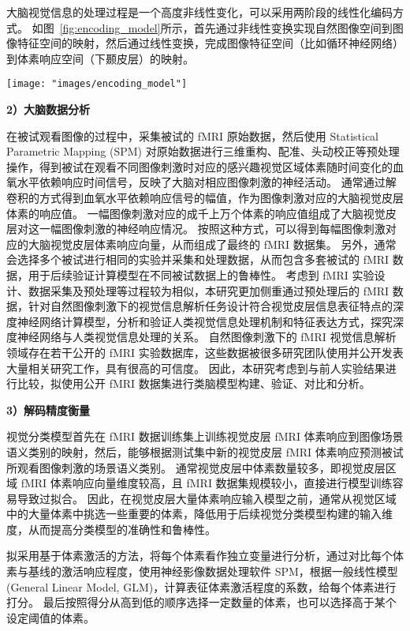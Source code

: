 \documentclass[a4paper,zihao=-4]{article}
\begin{document}
大脑视觉信息的处理过程是一个高度非线性变化，可以采用两阶段的线性化编码方式。
如图~\ref{fig:encoding_model}所示，首先通过非线性变换实现自然图像空间到图像特征空间的映射，然后通过线性变换，完成图像特征空间（比如循环神经网络）到体素响应空间（下颞皮层）的映射。
\begin{figure*}[htb!]
	\centering  
	{\texttt{[image: "images/encoding\_model"]}
	}
	\caption{ 两阶段非线性视觉编码模型原理图}
	\label{fig:encoding_model}
\end{figure*}


\textbf{2）大脑数据分析}

在被试观看图像的过程中，采集被试的 fMRI 原始数据，然后使用 Statistical Parametric Mapping (SPM) 对原始数据进行三维重构、配准、头动校正等预处理操作，得到被试在观看不同图像刺激时对应的感兴趣视觉区域体素随时间变化的血氧水平依赖响应时间信号，反映了大脑对相应图像刺激的神经活动。
通常通过解卷积的方式得到血氧水平依赖响应信号的幅值，作为图像刺激对应的大脑视觉皮层体素的响应值。
一幅图像刺激对应的成千上万个体素的响应值组成了大脑视觉皮层对这一幅图像刺激的神经响应情况。
按照这种方式，可以得到每幅图像刺激对应的大脑视觉皮层体素响应向量，从而组成了最终的 fMRI 数据集。
另外，通常会选择多个被试进行相同的实验并采集和处理数据，从而包含多套被试的 fMRI 数据，用于后续验证计算模型在不同被试数据上的鲁棒性。
考虑到 fMRI 实验设计、数据采集及预处理等过程较为相似，本研究更加侧重通过预处理后的 fMRI 数据，针对自然图像刺激下的视觉信息解析任务设计符合视觉皮层信息表征特点的深度神经网络计算模型，分析和验证人类视觉信息处理机制和特征表达方式，探究深度神经网络与人类视觉信息处理的关系。
自然图像刺激下的 fMRI 视觉信息解析领域存在若干公开的 fMRI 实验数据库，这些数据被很多研究团队使用并公开发表大量相关研究工作，具有很高的可信度。
因此，本研究考虑到与前人实验结果进行比较，拟使用公开 fMRI 数据集进行类脑模型构建、验证、对比和分析。


\textbf{3）解码精度衡量}

视觉分类模型首先在 fMRI 数据训练集上训练视觉皮层 fMRI 体素响应到图像场景语义类别的映射，然后，能够根据测试集中新的视觉皮层 fMRI 体素响应预测被试所观看图像刺激的场景语义类别。
通常视觉皮层中体素数量较多，即视觉皮层区域 fMRI 体素响应向量维度较高，且 fMRI 数据集规模较小，直接进行模型训练容易导致过拟合。
因此，在视觉皮层大量体素响应输入模型之前，通常从视觉区域中的大量体素中挑选一些重要的体素，降低用于后续视觉分类模型构建的输入维度，从而提高分类模型的准确性和鲁棒性。

拟采用基于体素激活的方法，将每个体素看作独立变量进行分析，通过对比每个体素与基线的激活响应程度，使用神经影像数据处理软件 SPM，根据一般线性模型(General Linear Model, GLM)，计算表征体素激活程度的系数，给每个体素进行打分。
最后按照得分从高到低的顺序选择一定数量的体素，也可以选择高于某个设定阈值的体素。
\end{document}
